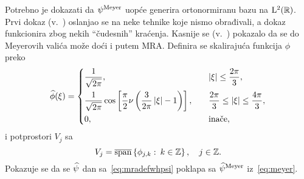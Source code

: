 \documentclass[main.tex]{subfiles}
\begin{document}
Potrebno je dokazati da \( \psi^{\mathrm{Meyer}} \) uopće generira
ortonormiranu bazu na \( \mathrm{L}^2(\mathbb{R}) \).
Prvi dokaz (v.~\cite[]{daub}) oslanjao se na neke tehnike
koje nismo obrađivali, a dokaz funkcionira zbog nekih
\enquote{čudesnih} kraćenja. Kasnije se (v.~\cite[]{daub})
pokazalo da se do Meyerovih valića može doći i putem MRA. Definira se
skalirajuća funkcija \( \phi \) preko
\begin{equation}
	\widehat{\phi}(\xi) = \begin{dcases}
		\frac 1{\sqrt{2\pi}},
		   & \quad \left| {\xi} \right| \le \frac {2\pi}3,                                                                           \\
		\frac 1{\sqrt{2\pi}}\cos\left[ \frac \pi2 \nu \left( \frac 3{2\pi} \left| {\xi} \right| - 1 \right) \right],
		   & \quad  \frac {2\pi}3 \le \left| {\xi} \right| \le \frac {4\pi}3,                                                        \\
		0, & \quad                                                                                         \text{inače},
	\end{dcases}
\end{equation}
i potprostori \( V_j \) sa
\begin{equation}
	V_j = \operatorname{\overline{span}} \left\{ \phi_{j,k} \, \colon \, k \in \mathbb{Z} \right\}, \quad j \in \mathbb{Z}.
\end{equation}
Pokazuje se da se \( \widehat{\psi} \) dan sa~\eqref{eq:mradefwhpsi}
poklapa sa \( \widehat{\psi}^{\mathrm{Meyer}} \) iz~\eqref{eq:meyer}.
\end{document}
